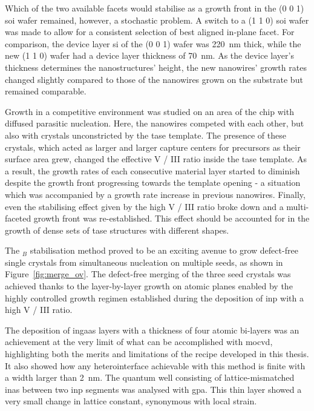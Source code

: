 Which of the two available  facets would stabilise as a growth front in the \hkl(0 0 1) \acf{soi} wafer remained, however, a stochastic problem. A switch to a \hkl(1 1 0) \acs{soi} wafer was made to allow for a consistent selection of best aligned  in-plane facet. For comparison, the device layer \acs{si} of the \hkl(0 0 1) wafer was \qty{220}{\nano\metre} thick, while the new \hkl(1 1 0) wafer had a device layer thickness of \qty{70}{\nano\metre}. As the device layer's thickness determines the nanostructures' height, the new nanowires' growth rates changed slightly compared to those of the nanowires grown on the  substrate but remained comparable.

Growth in a competitive environment was studied on an area of the chip with diffused parasitic nucleation. Here, the nanowires competed with each other, but also with crystals unconstricted by the \acs{tase} template. The presence of these crystals, which acted as larger and larger capture centers for precursors as their surface area grew, changed the effective V / III ratio inside the \acs{tase} template. As a result, the growth rates of each consecutive material layer started to diminish despite the growth front progressing towards the template opening - a situation which was accompanied by a growth rate increase in previous nanowires. Finally, even the stabilising effect given by the high V / III ratio broke down and a multi-faceted growth front was re-established. This effect should be accounted for in the growth of dense sets of \acs{tase} structures with different shapes.

The \(_B\) stabilisation method proved to be an exciting avenue to grow defect-free single crystals from simultaneous nucleation on multiple seeds, as shown in Figure~\ref{fig:merge_ov}. The defect-free merging of the three seed crystals was achieved thanks to the layer-by-layer growth on  atomic planes enabled by the highly controlled growth regimen established during the deposition of \acs{inp} with a high V / III ratio.

The deposition of \acs{ingaas} layers with a thickness of four atomic bi-layers was an achievement at the very limit of what can be accomplished with \acf{mocvd}, highlighting both the merits and limitations of the recipe developed in this thesis. It also showed how any heterointerface achievable with this method is finite with a width larger than \qty{2}{\nano\metre}. The quantum well consisting of lattice-mismatched \acf{inas} between two \acs{inp} segments was analysed with \acf{gpa}. This thin layer showed a very small change in lattice constant, synonymous with local strain.

